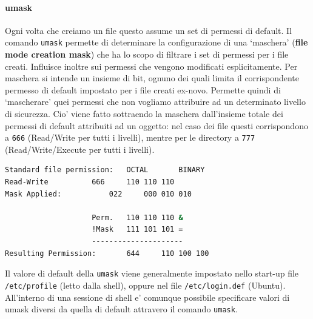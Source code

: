 \paragraph{umask}
Ogni volta che creiamo un file questo assume un set di permessi di default. Il comando \texttt{umask} permette di determinare la configurazione di una `maschera' (\textbf{file mode creation mask}) che ha lo scopo di filtrare i set di permessi per i file creati. Influisce inoltre sui permessi che vengono modificati esplicitamente. Per maschera si intende un insieme di bit, ognuno dei quali limita il corrispondente permesso di default impostato per i file creati ex-novo. Permette quindi di `mascherare' quei permessi che non vogliamo attribuire ad un determinato livello di sicurezza. Cio' viene fatto sottraendo la maschera dall'insieme totale dei permessi di default attribuiti ad un oggetto: nel caso dei file questi corrispondono a \texttt{666} (Read/Write per tutti i livelli), mentre per le directory a \texttt{777} (Read/Write/Execute per tutti i livelli).
\begin{lstlisting}[language=bash,basicstyle=\ttfamily,frame=single,caption={Calcolo dei permessi},captionpos=b]
Standard file permission: 	OCTAL		BINARY
Read-Write			666		110 110 110
Mask Applied:			022		000 010 010
	
					Perm.	110 110 110 &
					!Mask	111 101 101 =
					---------------------
Resulting Permission:		644		110 100 100
\end{lstlisting}
Il valore di default della \texttt{umask} viene generalmente impostato nello start-up file \texttt{/etc/profile} (letto dalla shell), oppure nel file \texttt{/etc/login.def} (Ubuntu). All'interno di una sessione di shell e' comunque possibile specificare valori di umask diversi da quella di default attravero il comando \texttt{umask}.
